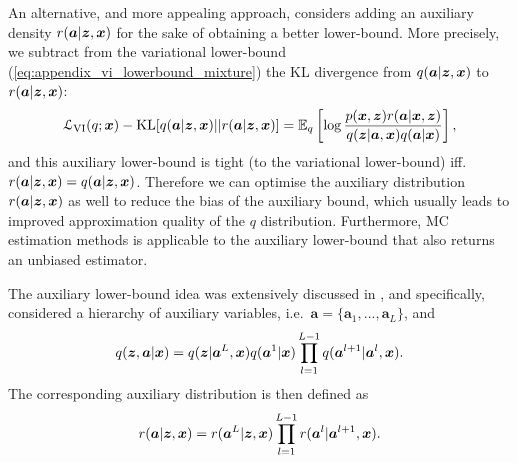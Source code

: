 An alternative, and more appealing approach, considers adding an auxiliary density $r(\bm{a} | \bm{z}, \bm{x})$ for the sake of obtaining a better lower-bound. More precisely, we subtract from the variational lower-bound (\ref{eq:appendix_vi_lowerbound_mixture}) the KL divergence from $q(\bm{a} | \bm{z}, \bm{x})$ to $r(\bm{a} | \bm{z}, \bm{x})$:
\begin{equation}
\mathcal{L}_{\text{VI}}(q; \bm{x}) - \mathrm{KL}[q(\bm{a} | \bm{z}, \bm{x}) || r(\bm{a} | \bm{z}, \bm{x})] 
= \mathbb{E}_{q} \left[ \log \frac{p(\bm{x}, \bm{z}) r(\bm{a} | \bm{x}, \bm{z})}{q(\bm{z} | \bm{a}, \bm{x}) q(\bm{a} | \bm{x})} \right],
\end{equation}
and this auxiliary lower-bound is tight (to the variational lower-bound) iff.~$r(\bm{a} | \bm{z}, \bm{x}) = q(\bm{a} | \bm{z}, \bm{x})$. Therefore we can optimise the auxiliary distribution $r(\bm{a} | \bm{z}, \bm{x})$ as well to reduce the bias of the auxiliary bound, which usually leads to improved approximation quality of the $q$ distribution. Furthermore, MC estimation methods is applicable to the auxiliary lower-bound that also returns an unbiased estimator.

The auxiliary lower-bound idea was extensively discussed in \citet{salimans:mcmcvi2015, tran:vgp2016, maaloe:agdm2016, ranganath:hvm2016}, and specifically, \cite{salimans:mcmcvi2015} considered a hierarchy of auxiliary variables, i.e.~$\bm{a} = \{ \bm{a}_1, ..., \bm{a}_L \}$, and
$$q(\bm{z}, \bm{a} | \bm{x}) = q(\bm{z} | \bm{a}^L, \bm{x}) q(\bm{a}^1 | \bm{x}) \prod_{l=1}^{L-1} q(\bm{a}^{l+1} | \bm{a}^l, \bm{x}).$$
The corresponding auxiliary distribution is then defined as 
$$r(\bm{a} | \bm{z}, \bm{x}) = r(\bm{a}^L | \bm{z}, \bm{x}) \prod_{l=1}^{L-1} r(\bm{a}^l | \bm{a}^{l+1}, \bm{x}).$$

